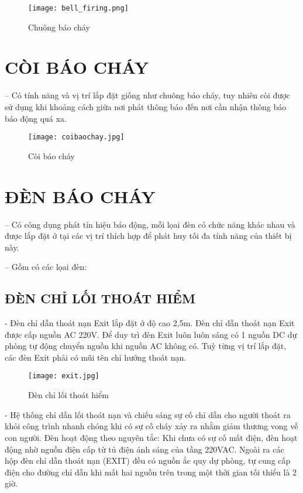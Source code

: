\begin{figure}[H]
	\centering
	\texttt{[image: bell\_firing.png]}
	\caption{Chuông báo cháy}
\end{figure}

\section{CÒI BÁO CHÁY}
-- Có tính năng và vị trí lắp đặt giống như chuông báo cháy, tuy nhiên còi được sử dụng khi khoảng cách giữa nơi phát thông báo đến nơi cần nhận thông báo báo động quá xa.
\begin{figure}[H]
	\vspace{-1cm}
	\centering
	\texttt{[image: coibaochay.jpg]}
	\caption{Còi báo cháy}
\end{figure}

\section{ĐÈN BÁO CHÁY}
-- Có công dụng phát tín hiệu báo động, mỗi lọai đèn có chức năng khác nhau và được lắp đặt ở tại các vị trí thích hợp để phát huy tối đa tính năng của thiết bị này.

-- Gồm có các lọai đèn:
\subsection{ĐÈN CHỈ LỐI THOÁT HIỂM}
- Đèn chỉ dẫn thoát nạn Exit lắp đặt ở độ cao 2,5m. Đèn chỉ dẫn thoát nạn Exit được cấp nguồn AC 220V. Để duy trì đèn Exit luôn luôn sáng có 1 nguồn DC dự phòng tự động chuyển nguồn khi nguồn AC không có. Tuỳ từng vị trí lắp đặt, các đèn Exit phải có mũi tên chỉ hướng thoát nạn.

\begin{wrapfigure}[10]{r}{0.4\textwidth}
	\vspace{-0.5cm}
	\centering
	\texttt{[image: exit.jpg]}
	\caption{Đèn chỉ lối thoát hiểm}
\end{wrapfigure}
- Hệ thống chỉ dẫn lối thoát nạn và chiếu sáng sự cố chỉ dẫn cho người thoát ra khỏi công trình nhanh chóng khi có sự cố cháy xảy ra nhằm giảm thương vong về con người. Đèn hoạt động theo nguyên tắc: Khi chưa có sự cố mất điện, đèn hoạt động nhờ nguồn điện cấp từ tủ điện ánh sáng của tầng 220VAC. Ngoài ra các hộp đèn chỉ dẫn thoát nạn (EXIT) đều có nguồn ắc quy dự phòng, tự cung cấp điện cho đường chỉ dẫn khi mất hai nguồn trên trong một thời gian tối thiểu là 2 giờ.

